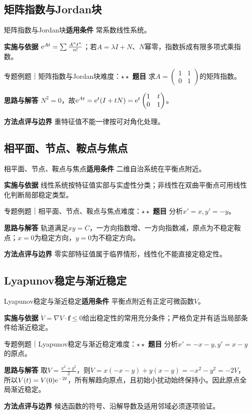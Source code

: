 \subsection{矩阵指数与Jordan块}\label{mat:ode_systems:jordan}
\begin{method}{矩阵指数与Jordan块}\textbf{适用条件} 常系数线性系统。\par\textbf{实施与依据} $\mathrm{e}^{At}=\sum \frac{A^nt^n}{n!}$；若$A=\lambda I+N$、$N$幂零，指数拆成有限多项式乘指数。\end{method}
\begin{example}{专题例题｜矩阵指数与Jordan块}{难度：$\star\star$}
\textbf{题目} 求$A=\begin{pmatrix}1&1\\0&1\end{pmatrix}$的矩阵指数。\par\textbf{思路与解答} $N^2=0$，故$\mathrm{e}^{At}=\mathrm{e}^t(I+tN)=\mathrm{e}^t\begin{pmatrix}1&t\\0&1\end{pmatrix}$。\par\textbf{方法点评与边界} 重特征值不能一律按可对角化处理。
\end{example}
\subsection{相平面、节点、鞍点与焦点}\label{mat:ode_systems:phase}
\begin{method}{相平面、节点、鞍点与焦点}\textbf{适用条件} 二维自治系统在平衡点附近。\par\textbf{实施与依据} 线性系统按特征值实部与实虚性分类；非线性在双曲平衡点可用线性化判断局部稳定类型。\end{method}
\begin{example}{专题例题｜相平面、节点、鞍点与焦点}{难度：$\star\star$}
\textbf{题目} 分析$x\prime=x,y\prime=-y$。\par\textbf{思路与解答} 轨道满足$xy=C$，一方向指数增、一方向指数减，原点为不稳定鞍点；$x=0$为稳定方向，$y=0$为不稳定方向。\par\textbf{方法点评与边界} 零实部特征值属于临界情形，线性化不能直接定稳定性。
\end{example}
\subsection{Lyapunov稳定与渐近稳定}\label{mat:ode_systems:lyapunov}
\begin{method}{Lyapunov稳定与渐近稳定}\textbf{适用条件} 平衡点附近有正定可微函数$V$。\par\textbf{实施与依据} $\dot V=\nabla V\cdot\bm f\le0$给出稳定性的常用充分条件；严格负定并有适当局部条件给渐近稳定。\end{method}
\begin{example}{专题例题｜Lyapunov稳定与渐近稳定}{难度：$\star\star$}
\textbf{题目} 分析$x\prime=-x-y,y\prime=x-y$的原点。\par\textbf{思路与解答} 取$V=\frac{x^2+y^2}{2}$，则$\dot V=x(-x-y)+y(x-y)=-x^2-y^2=-2V$，所以$V(t)=V(0)\mathrm{e}^{-2t}$，所有解趋向原点，且初始小扰动始终保持小。因此原点全局渐近稳定。\par\textbf{方法点评与边界} 候选函数的符号、沿解导数及适用邻域必须逐项验证。
\end{example}
